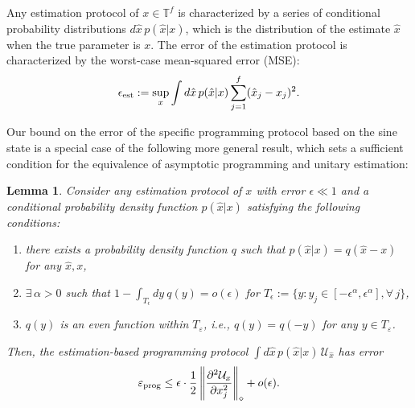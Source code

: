 \documentclass[11pt,letterpaper]{article}
\newtheorem{lem}{Lemma}
\def\eps{\varepsilon}
\def\map{\mathcal}
\begin{document}
Any estimation protocol of $x\in\mathbb{T}^f$ is characterized by a series of conditional probability distributions $d\hat{x}\,p(\hat{x}|x)$, which is the distribution of the estimate $\hat{x}$ when the true parameter is $x$. The error of the estimation protocol is characterized by the worst-case mean-squared error (MSE):
\begin{align}
    \epsilon_{\rm est}:=\sup_{x}\int d\hat{x}\,p(\hat{x}|x)\sum_{j=1}^f(\hat{x}_j-x_j)^2.
\end{align}

Our bound on the error of the specific programming protocol based on the sine state is a special case of the following more general result, which sets a sufficient condition for the equivalence of asymptotic programming and unitary estimation:
\begin{lem}\label{lem:estprog}
    Consider any estimation protocol of $x$ with error $\epsilon\ll 1$ and a conditional probability density function $p(\hat{x}|x)$ satisfying the following conditions: 
    \begin{enumerate}
        \item there exists a probability density function $q$ such that $p(\hat{x}|x)=q(\hat{x}-x)$ for any $\hat{x},x$, 
        \item $\exists\,\alpha>0$ such that $1-\int_{T_\epsilon}dy~q(y)=o(\epsilon)$ for $T_\epsilon:=\{y:y_j\in[-\epsilon^\alpha,\epsilon^\alpha],\forall\,j\}$,
        \item  $q(y)$ is an even function within $T_\eps$, i.e., $q(y)=q(-y)$ for any $y\in T_\eps$.
    \end{enumerate}
    Then, the estimation-based programming protocol $\int d\hat{x}\,p(\hat{x}|x)\,\mathcal{U}_{\hat{x}}$ has error
    \begin{align}
        \eps_{\rm prog}\le \epsilon\cdot\frac12\left\|\frac{\partial^2\map{U}_x}{\partial x_{j}^2}\right\|_{\diamond} + o(\epsilon).
    \end{align}
\end{lem}
\end{document}
